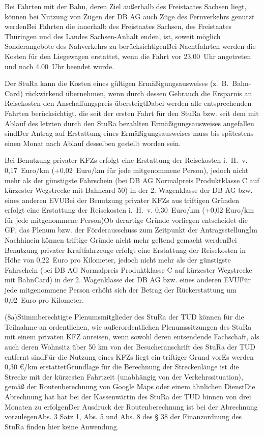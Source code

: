 \begin{multicols}{2}
\Abs \Satz Bei Fahrten mit der Bahn, deren Ziel außerhalb des Freistaates Sachsen liegt, können bei Nutzung von Zügen der DB AG auch Züge des Fernverkehrs genutzt werden\. Bei Fahrten die innerhalb des Freistaates Sachsen, des Freistaates Thüringen und des Landes Sachsen-Anhalt enden, ist, soweit möglich Sonderangebote des Nahverkehrs zu berücksichtigen\. Bei Nachtfahrten werden die Kosten für den Liegewagen erstattet, wenn die Fahrt vor 23.00~Uhr angetreten und nach 4.00~Uhr beendet wurde.

\Abs \Satz Der StuRa kann die Kosten eines gültigen Ermäßigungsausweises (z.~B.~Bahn-Card) rückwirkend übernehmen, wenn durch dessen Gebrauch die Ersparnis an Reisekosten den Anschaffungspreis übersteigt\. Dabei werden alle entsprechenden Fahrten berücksichtigt, die seit der ersten Fahrt für den StuRa bzw. seit dem mit Ablauf des letzten durch den StuRa bezahlten Ermäßigungsausweises angefallen sind\. Der Antrag auf Erstattung eines Ermäßigungsausweises muss bis spätestens einen Monat nach Ablauf desselben gestellt worden sein.

\Abs \Satz Bei Benutzung privater KFZs erfolgt eine Erstattung der Reisekosten i.~H.~v. 0,17~Euro/km (+0,02~Euro/km für jede mitgenommene Person), jedoch nicht mehr als der günstigste Fahrschein (bei DB AG Normalpreis Produktklasse C auf kürzester Wegstrecke mit Bahncard 50) in der 2. Wagenklasse der DB AG bzw. eines anderen EVU\. Bei der Benutzung privater KFZs aus triftigen Gründen erfolgt eine Erstattung der Reisekosten i.~H.~v. 0,30~Euro/km (+0,02 Euro/km für jede mitgenommene Person)\. Ob derartige Gründe vorliegen entscheidet die GF, das Plenum bzw. der Förderausschuss zum Zeitpunkt der Antragsstellung\. Im Nachhinein können triftige Gründe nicht mehr geltend gemacht werden\. Bei Benutzung privater Kraftfahrzeuge erfolgt eine Erstattung der Reisekosten in Höhe von 0,22~Euro pro Kilometer, jedoch nicht mehr als der günstigste Fahrschein (bei DB AG Normalpreis Produktklasse C auf kürzester Wegstrecke mit BahnCard) in der 2. Wagenklasse der DB AG bzw. eines anderen EVU\. Für jede mitgenommene Person erhöht sich der Betrag der Rückerstattung um 0,02~Euro pro Kilometer.

\setcounter{absatz}{8}
\setcounter{sentence}{0} 

(8a)\Satz Stimmberechtigte Plenumsmitglieder des StuRa der TUD können für die Teilnahme an ordentlichen, wie außerordentlichen Plenumssitzungen des StuRa mit einem privaten KFZ anreisen, wenn sowohl deren entsendende Fachschaft, als auch deren Wohnsitz über 50 km von der Besucheranschrift des StuRa der TUD entfernt sind\. Für die Nutzung eines KFZs liegt ein triftiger Grund vor\. Es werden 0,30 €/km erstattet\. Grundlage für die Berechnung der Streckenlänge ist die Strecke mit der kürzesten Fahrtzeit (unabhängig von der Verkehrssituation), gemäß der Routenberechnung von Google Maps oder einem ähnlichen Dienst\. Die Abrechnung hat hat bei der Kassenwärtin des StuRa der TUD binnen von drei Monaten zu erfolgen\. Der Ausdruck der Routenberechnung ist bei der Abrechnung vorzulegen\. Abs. 3 Satz 1, Abs. 5 und Abs. 8 des § 38 der Finanzordnung des StuRa finden hier keine Anwendung.


\end{multicols}
